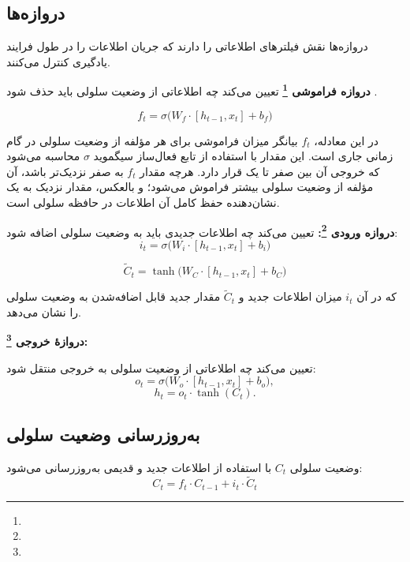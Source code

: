 \subsection{دروازه‌ها}
دروازه‌ها نقش فیلترهای اطلاعاتی را دارند که جریان اطلاعات را در طول فرایند یادگیری کنترل می‌کنند.


    \textbf{دروازه فراموشی \footnote{}}
	تعیین می‌کند چه اطلاعاتی از وضعیت سلولی باید حذف شود
	\cite{gers1999learning}.
	
	\begin{equation}
		f_t = \sigma \big( W_f \cdot [h_{t-1}, x_t] + b_f \big)
	\end{equation}

در این معادله، \( f_t \) بیانگر میزان فراموشی برای هر مؤلفه از وضعیت سلولی در گام زمانی جاری است. این مقدار با استفاده از تابع فعال‌ساز سیگموید \( \sigma \) محاسبه می‌شود که خروجی آن بین صفر تا یک قرار دارد. هرچه مقدار \( f_t \) به صفر نزدیک‌تر باشد، آن مؤلفه از وضعیت سلولی بیشتر فراموش می‌شود؛ و بالعکس، مقدار نزدیک به یک نشان‌دهنده حفظ کامل آن اطلاعات در حافظه سلولی است.



	\textbf{دروازه ورودی \footnote{}:}
	تعیین می‌کند چه اطلاعات جدیدی باید به وضعیت سلولی اضافه شود:
	\begin{equation}
		i_t = \sigma \big( W_i \cdot [h_{t-1}, x_t] + b_i \big)
	\end{equation}
	
	\begin{equation}
		\tilde{C}_t = \tanh \big( W_C \cdot [h_{t-1}, x_t] + b_C \big)
	\end{equation}

	که در آن \( i_t \) میزان اطلاعات جدید و \( \tilde{C}_t \) مقدار جدید قابل اضافه‌شدن به وضعیت سلولی را نشان می‌دهد.
	
\textbf{دروازهٔ خروجی \footnote{}:}

	تعیین می‌کند چه اطلاعاتی از وضعیت سلولی به خروجی منتقل شود:
	\[
	o_t = \sigma \big( W_o \cdot [h_{t-1}, x_t] + b_o \big),
	\]
	\[
	h_t = o_t \cdot \tanh(C_t).
	\]


\subsection{به‌روزرسانی وضعیت سلولی}
وضعیت سلولی \( C_t \) با استفاده از اطلاعات جدید و قدیمی به‌روزرسانی می‌شود:
	\begin{equation}
		C_t = f_t \cdot C_{t-1} + i_t \cdot \tilde{C}_t
	\end{equation}

